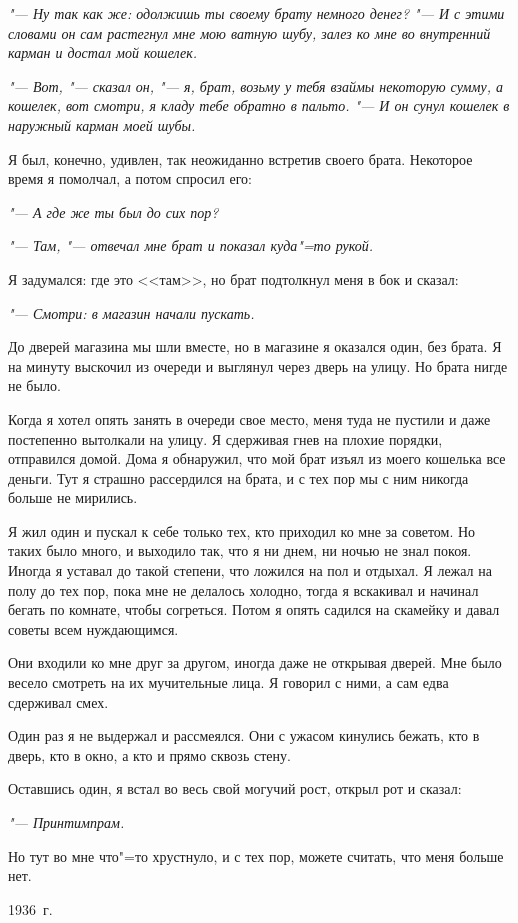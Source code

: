 \textit{"--- Ну так как же: одолжишь ты своему брату немного денег? "--- И с этими словами он сам растегнул мне мою ватную шубу, залез ко мне во внутренний карман и достал мой кошелек.}

\textit{"--- Вот, "--- сказал он, "--- я, брат, возьму у тебя взаймы некоторую сумму, а кошелек, вот смотри, я кладу тебе обратно в пальто. "--- И он сунул кошелек в наружный карман моей шубы.}

Я был, конечно, удивлен, так неожиданно встретив своего брата. Некоторое время я помолчал, а потом спросил его:

\textit{"--- А где же ты был до сих пор?}

\textit{"--- Там, "--- отвечал мне брат и показал куда"=то рукой.}

Я задумался: где это <<там>>, но брат подтолкнул меня в бок и сказал:

\textit{"--- Смотри: в магазин начали пускать.}

До дверей магазина мы шли вместе, но в магазине я оказался один, без брата. Я на минуту выскочил из очереди и выглянул через дверь на улицу. Но брата нигде не было.

Когда я хотел опять занять в очереди свое место, меня туда не пустили и даже постепенно вытолкали на улицу. Я сдерживая гнев на плохие порядки, отправился домой. Дома я обнаружил, что мой брат изъял из моего кошелька все деньги. Тут я страшно рассердился на брата, и с тех пор мы с ним никогда больше не мирились.

Я жил один и пускал к себе только тех, кто приходил ко мне за советом. Но таких было много, и выходило так, что я ни днем, ни ночью не знал покоя. Иногда я уставал до такой степени, что ложился на пол и отдыхал. Я лежал на полу до тех пор, пока мне не делалось холодно, тогда я вскакивал и начинал бегать по комнате, чтобы согреться. Потом я опять садился на скамейку и давал советы всем нуждающимся.

Они входили ко мне друг за другом, иногда даже не открывая дверей. Мне было весело смотреть на их мучительные лица. Я говорил с ними, а сам едва сдерживал смех.

Один раз я не выдержал и рассмеялся. Они с ужасом кинулись бежать, кто в дверь, кто в окно, а кто и прямо сквозь стену.

Оставшись один, я встал во весь свой могучий рост, открыл рот и сказал:

\textit{"--- Принтимпрам.}

Но тут во мне что"=то хрустнуло, и с тех пор, можете считать, что меня больше нет.

\begin{flushright}
1936~г.
\end{flushright}
